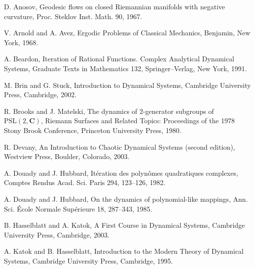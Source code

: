 \documentclass[12pt]{article}
\theoremstyle{definition}
\theoremstyle{remark}
\begin{document}
\begin{thebibliography}{200000}


D. Anosov, Geodesic flows on closed Riemannian manifolds with negative curvature,
Proc. Steklov Inst. Math. 90, 1967.

V. Arnold and A. Avez, Ergodic Problems of Classical Mechanics, Benjamin, New York, 1968.

A. Beardon, Iteration of Rational Functions. Complex Analytical Dynamical Systems, 
Graduate Texts in Mathematics 132, Springer--Verlag, New York, 1991.



M. Brin and G. Stuck, Introduction to Dynamical Systems, Cambridge University Press, Cambridge,
2002.

R. Brooks and J. Matelski, The dynamics of $2$-generator subgroups of $\mathrm{PSL}(2,\mathbf C)$,
Riemann Surfaces  and Related Topics: Proceedings of the 1978 Stony Brook Conference,
Princeton University Press, 1980.

R. Devany, An Introduction to Chaotic Dynamical Systems (second edition),
Westview Press, Boulder, Colorado, 2003.


A. Douady and J. Hubbard,
It\'eration des polyn\^omes quadratiques complexes, Comptes Rendus Acad. Sci. Paris 294, 123--126, 1982.

A. Douady and J. Hubbard,
On the dynamics of polynomial-like mappings, Ann. Sci. \'Ecole Normale
Sup\'erieure 18, 287--343, 1985.

B. Hasselblatt and A. Katok, A First Course in Dynamical Systems,
Cambridge University Press, Cambridge,
2003.

A. Katok and B. Hasselblatt, Introduction to the Modern Theory of Dynamical
Systems, Cambridge University Press, Cambridge,
1995.


\end{thebibliography}
\end{document}
